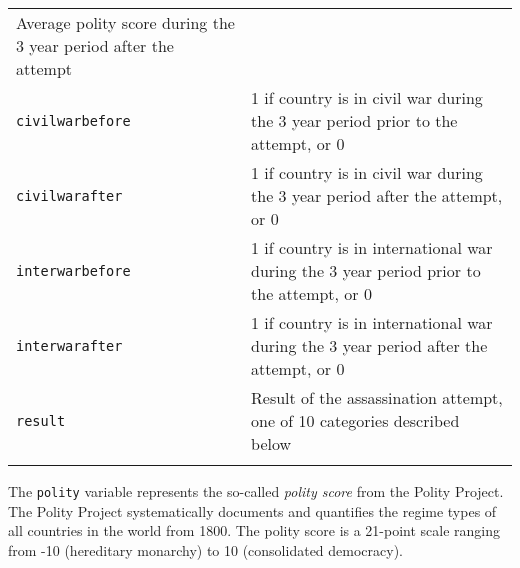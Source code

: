 \documentclass[]{article}
\begin{document}
\begin{longtable}[c]{@{}ll@{}}
\begin{minipage}[t]{0.68\columnwidth}
Average polity score during the 3 year period after the attempt
\end{minipage}
\\\addlinespace
\begin{minipage}[t]{0.25\columnwidth}\raggedright
\texttt{civilwarbefore}
\end{minipage} & \begin{minipage}[t]{0.68\columnwidth}\raggedright
1 if country is in civil war during the 3 year period prior to the
attempt, or 0
\end{minipage}
\\\addlinespace
\begin{minipage}[t]{0.25\columnwidth}\raggedright
\texttt{civilwarafter}
\end{minipage} & \begin{minipage}[t]{0.68\columnwidth}\raggedright
1 if country is in civil war during the 3 year period after the attempt,
or 0
\end{minipage}
\\\addlinespace
\begin{minipage}[t]{0.25\columnwidth}\raggedright
\texttt{interwarbefore}
\end{minipage} & \begin{minipage}[t]{0.68\columnwidth}\raggedright
1 if country is in international war during the 3 year period prior to
the attempt, or 0
\end{minipage}
\\\addlinespace
\begin{minipage}[t]{0.25\columnwidth}\raggedright
\texttt{interwarafter}
\end{minipage} & \begin{minipage}[t]{0.68\columnwidth}\raggedright
1 if country is in international war during the 3 year period after the
attempt, or 0
\end{minipage}
\\\addlinespace
\begin{minipage}[t]{0.25\columnwidth}\raggedright
\texttt{result}
\end{minipage} & \begin{minipage}[t]{0.68\columnwidth}\raggedright
Result of the assassination attempt, one of 10 categories described
below
\end{minipage}
\\\addlinespace
\bottomrule
\end{longtable}

The \texttt{polity} variable represents the so-called \emph{polity
score} from the Polity Project. The Polity Project systematically
documents and quantifies the regime types of all countries in the world
from 1800. The polity score is a 21-point scale ranging from -10
(hereditary monarchy) to 10 (consolidated democracy).
\end{document}
